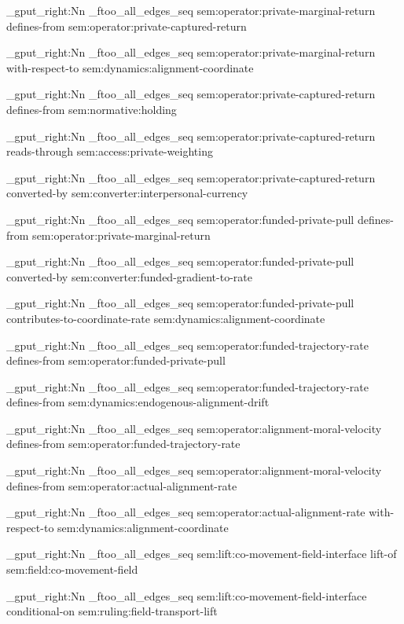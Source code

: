 \seq_gput_right:Nn \g_ftoo_all_edges_seq { { sem:operator:private-marginal-return } { defines-from } { sem:operator:private-captured-return } }

\seq_gput_right:Nn \g_ftoo_all_edges_seq { { sem:operator:private-marginal-return } { with-respect-to } { sem:dynamics:alignment-coordinate } }

\seq_gput_right:Nn \g_ftoo_all_edges_seq { { sem:operator:private-captured-return } { defines-from } { sem:normative:holding } }

\seq_gput_right:Nn \g_ftoo_all_edges_seq { { sem:operator:private-captured-return } { reads-through } { sem:access:private-weighting } }

\seq_gput_right:Nn \g_ftoo_all_edges_seq { { sem:operator:private-captured-return } { converted-by } { sem:converter:interpersonal-currency } }

\seq_gput_right:Nn \g_ftoo_all_edges_seq { { sem:operator:funded-private-pull } { defines-from } { sem:operator:private-marginal-return } }

\seq_gput_right:Nn \g_ftoo_all_edges_seq { { sem:operator:funded-private-pull } { converted-by } { sem:converter:funded-gradient-to-rate } }

\seq_gput_right:Nn \g_ftoo_all_edges_seq { { sem:operator:funded-private-pull } { contributes-to-coordinate-rate } { sem:dynamics:alignment-coordinate } }

\seq_gput_right:Nn \g_ftoo_all_edges_seq { { sem:operator:funded-trajectory-rate } { defines-from } { sem:operator:funded-private-pull } }

\seq_gput_right:Nn \g_ftoo_all_edges_seq { { sem:operator:funded-trajectory-rate } { defines-from } { sem:dynamics:endogenous-alignment-drift } }

\seq_gput_right:Nn \g_ftoo_all_edges_seq { { sem:operator:alignment-moral-velocity } { defines-from } { sem:operator:funded-trajectory-rate } }

\seq_gput_right:Nn \g_ftoo_all_edges_seq { { sem:operator:alignment-moral-velocity } { defines-from } { sem:operator:actual-alignment-rate } }

\seq_gput_right:Nn \g_ftoo_all_edges_seq { { sem:operator:actual-alignment-rate } { with-respect-to } { sem:dynamics:alignment-coordinate } }

\seq_gput_right:Nn \g_ftoo_all_edges_seq { { sem:lift:co-movement-field-interface } { lift-of } { sem:field:co-movement-field } }

\seq_gput_right:Nn \g_ftoo_all_edges_seq { { sem:lift:co-movement-field-interface } { conditional-on } { sem:ruling:field-transport-lift } }

